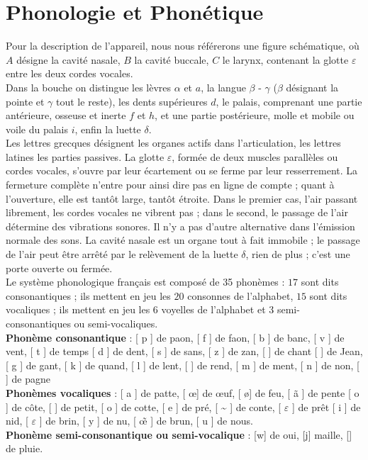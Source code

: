 \documentclass[12pt, twoside]{report}
\begin{document}
\chapter{Phonologie et Phonétique} \label{phonologie_phonetique}

\indent Pour la description de l'appareil, nous nous référerons une figure schématique, où $A$ désigne la cavité nasale, $B$ la cavité buccale, $C$ le larynx, contenant la glotte $\varepsilon$ entre les deux cordes vocales.\\
\indent Dans la bouche on distingue les lèvres $\alpha$ et $a$, la langue $\beta$ - $\gamma$ ($\beta$ désignant la pointe et $\gamma$ tout le reste), les dents supérieures $d$, le palais, comprenant une partie antérieure, osseuse et inerte $f$ et $h$, et une partie postérieure, molle et mobile ou voile du palais $i$, enfin la luette $\delta$. \\ 
\indent Les lettres grecques désignent les organes actifs dans l'articulation, les lettres latines les parties passives. La glotte $\varepsilon$, formée de deux muscles parallèles ou cordes vocales, s'ouvre par leur écartement ou se ferme par leur resserrement. La fermeture complète n'entre pour ainsi dire pas en ligne de compte ; quant à l'ouverture, elle est tantôt large, tantôt étroite. Dans le premier cas, l'air passant librement, les cordes vocales ne vibrent pas ; dans le second, le passage de l'air détermine des vibrations sonores. Il n'y a pas d'autre alternative dans l'émission normale des sons. La cavité nasale est un organe tout à fait immobile ; le passage de l'air peut être arrêté par le relèvement de la luette $\delta$, rien de plus ; c'est une porte ouverte ou fermée.\\

\indent Le système phonologique français est composé de 35 phonèmes : $17$ sont dits consonantiques ; ils mettent en jeu les $20$ consonnes de l'alphabet, $15$ sont dits vocaliques ; ils mettent en jeu les $6$ voyelles de l'alphabet et $3$ semi-consonantiques ou semi-vocaliques.\\

\indent \textbf{Phonème consonantique} : [ p ] de paon, [ f ] de faon,  [ b ] de banc, [ v ] de vent, [ t ] de temps [ d ] de dent, [ s ] de sans, [ z ] de zan, [ \textesh  ] de chant [ \textyogh  ] de Jean,  [ g ] de gant, [ k ] de quand,  [ l ] de lent, [ \textscr ] de rend,  [ m ] de ment, [ n ] de non,  [ \textltailn ] de pagne \\ 
\indent \textbf{Phonèmes vocaliques} :  [ a ] de patte, [ \oe ] de \oe uf, [ \o ] de feu, [ \~a ] de pente [ o ] de côte, [ \textschwa  ] de petit, [ o ] de cotte, [ e ] de pré, [ \~{\textopeno} ] de conte, [ $\varepsilon$ ]  de prêt [ i ] de nid, [ $\varepsilon$ ]   de brin, [ y ] de nu, [ \~{\oe} ] de brun, [ u ] de nous. \\ 
\indent \textbf{Phonème semi-consonantique ou semi-vocalique} : [w] de oui, [j] maille, [\textturnh] de pluie.\\
\end{document}
